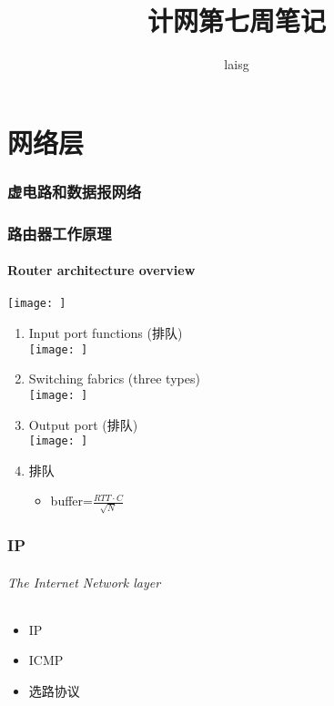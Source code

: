 \documentclass[UTF8]{article}
\title{计网第七周笔记}
\author{laisg}
\begin{document}
 \maketitle 
 \part{网络层}%
 \label{prt:网络层}

 \section{虚电路和数据报网络}%
 \label{sec:虚电路和数据报网络}

 \section{路由器工作原理}%
 \label{sec:路由器工作原理}

 \subsection{Router architecture overview}%
 \label{sub:router_architecture_overview}

 \texttt{[image: ]} 

 \begin{enumerate}
   \item Input port functions (排队)\\
   \texttt{[image: ]} 

   \item Switching fabrics (three types)\\
   \texttt{[image: ]} 

   \item Output port (排队)\\
   \texttt{[image: ]} 

   \item 排队
   \begin{itemize}
     \item buffer=$\frac{RTT\cdot C}{\sqrt{N}}$
   \end{itemize}
   
 \end{enumerate}

 \section{IP}%
 \label{sec:ip}

 \paragraph{The Internet Network layer}%
 \label{par:the_internet_network_layer}
 \begin{itemize}
   \item IP
   \item ICMP
   \item 选路协议
 \end{itemize}
\end{document}
